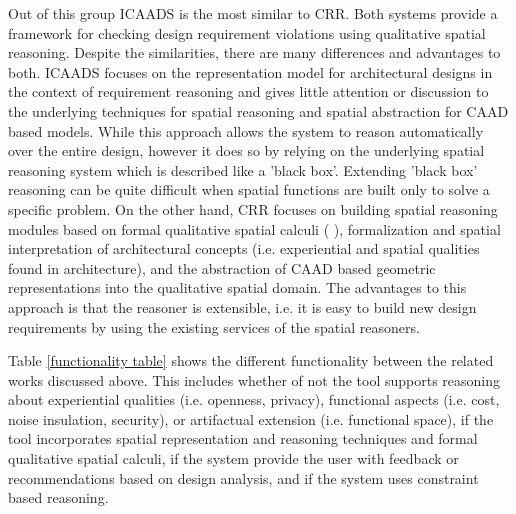 \documentclass[12pt]{ucthesis}
\begin{document}
\begin{table}[H]
  \begin{center}
  \end{center}
\caption{System Objectives}
\label{related works table}
\end{table}   

Out of this group ICAADS is the most similar to CRR. Both systems provide a framework for checking design requirement violations using qualitative spatial reasoning. Despite the similarities, there are many differences and advantages to both. ICAADS focuses on the representation model for architectural designs in the context of requirement reasoning and gives little attention or discussion to the underlying techniques for spatial reasoning and spatial abstraction for CAAD based models. While this approach allows the system to reason automatically over the entire design, however it does so by relying on the underlying spatial reasoning system which is described like a 'black box'. Extending 'black box' reasoning can be quite difficult when spatial functions are built only to solve a specific problem. On the other hand, CRR focuses on building spatial reasoning modules based on formal qualitative spatial calculi (\cite{scc} \cite{opra} \cite{topolog}), formalization and spatial interpretation of architectural concepts (i.e. experiential and spatial qualities found in architecture), and the abstraction of CAAD based geometric representations into the qualitative spatial domain. The advantages to this approach is that the reasoner is extensible, i.e. it is easy to build new design requirements by using the existing services of the spatial reasoners.  

Table \ref{functionality table} shows the different functionality between the related works discussed above. This includes whether of not the tool supports reasoning about experiential qualities (i.e. openness, privacy), functional aspects (i.e. cost, noise insulation, security), or artifactual extension (i.e. functional space), if the tool incorporates spatial representation and reasoning techniques and formal qualitative spatial calculi, if the system provide the user with feedback or recommendations based on design analysis, and if the system uses constraint based reasoning.
\end{document}

